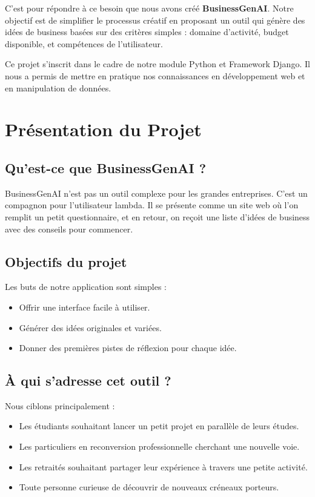 \documentclass[12pt,a4paper]{report}
\begin{document}
C'est pour répondre à ce besoin que nous avons créé \textbf{BusinessGenAI}. Notre objectif est de simplifier le processus créatif en proposant un outil qui génère des idées de business basées sur des critères simples : domaine d'activité, budget disponible, et compétences de l'utilisateur.

Ce projet s'inscrit dans le cadre de notre module Python et Framework Django. Il nous a permis de mettre en pratique nos connaissances en développement web et en manipulation de données.

\newpage

\chapter{Présentation du Projet}

\section{Qu'est-ce que BusinessGenAI ?}
BusinessGenAI n'est pas un outil complexe pour les grandes entreprises. C'est un compagnon pour l'utilisateur lambda. Il se présente comme un site web où l'on remplit un petit questionnaire, et en retour, on reçoit une liste d'idées de business avec des conseils pour commencer.

\section{Objectifs du projet}
Les buts de notre application sont simples :
\begin{itemize}
    \item Offrir une interface facile à utiliser.
    \item Générer des idées originales et variées.
    \item Donner des premières pistes de réflexion pour chaque idée.
\end{itemize}

\section{À qui s'adresse cet outil ?}
Nous ciblons principalement :
\begin{itemize}
    \item Les étudiants souhaitant lancer un petit projet en parallèle de leurs études.
    \item Les particuliers en reconversion professionnelle cherchant une nouvelle voie.
    \item Les retraités souhaitant partager leur expérience à travers une petite activité.
    \item Toute personne curieuse de découvrir de nouveaux créneaux porteurs.
\end{itemize}
\end{document}
